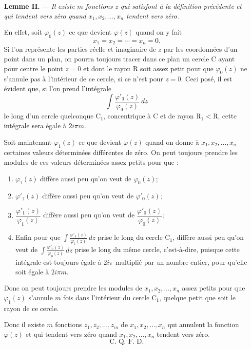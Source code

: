 \documentclass[11pt]{article}
\begin{document}
\medskip
\noindent\textbf{Lemme II.} — \emph{Il existe $m$ fonctions $z$ qui satisfont à la définition précédente et qui tendent vers zéro quand $x_1,x_2,\ldots,x_n$ tendent vers zéro.}

En effet, soit $\varphi_0(z)$ ce que devient $\varphi(z)$ quand on y fait
\[
x_1=x_2=\cdots=x_n=0.
\]
Si l'on représente les parties réelle et imaginaire de $z$ par les coordonnées d'un point dans un plan, on pourra toujours tracer dans ce plan un cercle C ayant pour centre le point $z=0$ et dont le rayon R soit assez petit pour que $\varphi_0(z)$ ne s'annule pas à l'intérieur de ce cercle, si ce n'est pour $z=0$. Ceci posé, il est évident que, si l'on prend l'intégrale
\[
\int \frac{\varphi'_0(z)}{\varphi_0(z)}\,dz
\]
le long d'un cercle quelconque $\mathrm C_1$, concentrique à C et de rayon $\mathrm R_1<\mathrm R$, cette intégrale sera égale à $2i\pi m$.

Soit maintenant $\varphi_1(z)$ ce que devient $\varphi(z)$ quand on donne à $x_1,x_2,\ldots,x_n$ certaines valeurs déterminées différentes de zéro. On peut toujours prendre les modules de ces valeurs déterminées assez petits pour que :
\begin{enumerate}[label=\arabic*\textsuperscript{o}, leftmargin=3em, itemsep=0pt]
\item $\varphi_1(z)$ diffère aussi peu qu'on veut de $\varphi_0(z)$;
\item $\varphi'_1(z)$ diffère aussi peu qu'on veut de $\varphi'_0(z)$;
\item $\dfrac{\varphi'_1(z)}{\varphi_1(z)}$ diffère aussi peu qu'on veut de $\dfrac{\varphi'_0(z)}{\varphi_0(z)}$;
\item Enfin pour que $\displaystyle\int \frac{\varphi'_1(z)}{\varphi_1(z)}\,dz$ prise le long du cercle $\mathrm C_1$, diffère aussi peu qu'on veut de $\displaystyle\int \frac{\varphi'_0(z)}{\varphi_0(z)}\,dz$ prise le long du même cercle, c'est-à-dire, puisque cette intégrale est toujours égale à $2i\pi$ multiplié par un nombre entier, pour qu'elle soit égale à $2i\pi m$.
\end{enumerate}
Donc on peut toujours prendre les modules de $x_1,x_2,\ldots,x_n$ assez petits pour que $\varphi_1(z)$ s'annule $m$ fois dans l'intérieur du cercle $\mathrm C_1$, quelque petit que soit le rayon de ce cercle.

Donc il existe $m$ fonctions $z_1,z_2,\ldots,z_m$ de $x_1,x_2,\ldots,x_n$ qui annulent la fonction $\varphi(z)$ et qui tendent vers zéro quand $x_1,x_2,\ldots,x_n$ tendent vers zéro.
\[
\text{C. Q. F. D.}
\]
\end{document}

